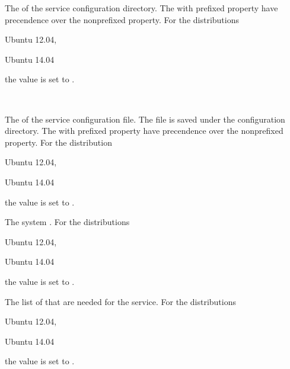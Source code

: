 The  of the service configuration directory.
The with  prefixed property have precendence over the 
nonprefixed property.
For the distributions
\begin{inparaitem}
\item[\TheDistribution{ubuntu}] Ubuntu 12.04,
\item[\TheDistribution{ubuntu}] Ubuntu 14.04
\end{inparaitem}
the value is set to .

\\

The  of the service configuration file. The file is saved
under the configuration directory.
The with  prefixed property have precendence over the 
nonprefixed property.
For the distribution
\begin{inparaitem}
\item[\TheDistribution{ubuntu}] Ubuntu 12.04,
\item[\TheDistribution{ubuntu}] Ubuntu 14.04
\end{inparaitem}
the value is set to .


The system . 
For the distributions
\begin{inparaitem}
\item[\TheDistribution{ubuntu}] Ubuntu 12.04,
\item[\TheDistribution{ubuntu}] Ubuntu 14.04
\end{inparaitem}
the value is set to .


The list of  that are needed for the service.
For the distributions
\begin{inparaitem}
\item[\TheDistribution{ubuntu}] Ubuntu 12.04,
\item[\TheDistribution{ubuntu}] Ubuntu 14.04
\end{inparaitem}
the value is set to .

